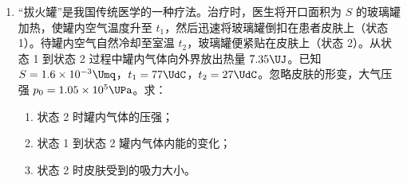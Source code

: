 \documentclass[\gkver]{gaokaozhenti}
\begin{document}
\begin{enumerate}
{$U/\UV \approx 1.442 - 0.649(I/\UA)$，故 $E \approx 1.44\UV$、$r \approx 0.65\UO$。手工作图读数可略有差异。

（二）（1）单摆摆动过程中，在最低点绳子的拉力最大，相邻两次拉力最大的时间间隔为半个周期。从图 2 可知，从起始值到终止值经历的时间间隔 $\Delta t = 7.6530\Us - 1.1277\Us = 6.5253\Us$

则有 $\Delta t = 10 \cdot \frac{T}{2}$，解得 $T = 1.31\Us$

由题可得 $(n - 1)\frac{T}{2} = t$，解得周期为 $T = \frac{2t}{n - 1}$

（2）设小钢球重心到摆线下端的高度差为 $h$，则摆长为 $L = h + l$

根据单摆周期公式有 $T = 2\pi\sqrt{\frac{L}{g}}$

可得 $T = 2\pi\sqrt{\frac{h + l}{g}}$

变形得 $l = \frac{g}{4\pi^{2}}T^{2} - h$

可得 $l-T^{2}$ 图像的斜率为 $k = \frac{g}{4\pi^{2}}$

解得 $g = 4\pi^{2}k$

当 $T^{2} = b$ 时 $l = 0$，则有 $0 = \frac{g}{4\pi^{2}} \times b - h$

解得小钢球重心到摆线下端的高度差 $h = kb$

（3）小钢球有具体形状和大小，不能将其看作质点，其质心的运动轨迹半径与圆弧槽半径有偏差，导致计算时所用“摆长”不准确。
}

\item
“拔火罐”是我国传统医学的一种疗法。治疗时，医生将开口面积为 $S$ 的玻璃罐加热，使罐内空气温度升至 $t_{1}$，然后迅速将玻璃罐倒扣在患者皮肤上（状态 1）。待罐内空气自然冷却至室温 $t_{2}$，玻璃罐便紧贴在皮肤上（状态 2）。从状态 1 到状态 2 过程中罐内气体向外界放出热量 $7.35\UJ$。已知 $S = 1.6 \times 10^{-3}\Umq$，$t_{1} = 77\UdC$，$t_{2} = 27\UdC$。忽略皮肤的形变，大气压强 $p_{0} = 1.05 \times 10^{5}\UPa$。求：


\begin{enumerate}
	\item
	状态 2 时罐内气体的压强；
	\item
	状态 1 到状态 2 罐内气体内能的变化；
	\item
	状态 2 时皮肤受到的吸力大小。
\end{enumerate}


\end{enumerate}
\end{document}
